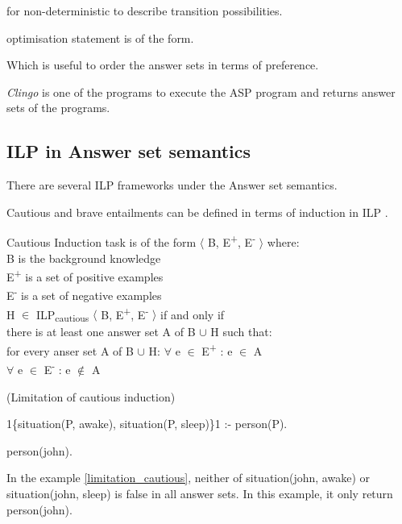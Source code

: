 \documentclass[12pt,twoside]{report}
\begin{document}
for non-deterministic to describe transition possibilities.

optimisation statement is of the form.

Which is useful to order the answer sets in terms of preference.

\textit{Clingo} is one of the programs to execute the ASP program and returns answer sets of the programs.


\subsection{ILP in Answer set semantics}

There are several ILP frameworks under the Answer set semantics.

Cautious and brave entailments can be defined in terms of induction in ILP \cite{Sakama2009}.


Cautious Induction task is of the form $\langle$ B, E\textsuperscript{+}, E\textsuperscript{-} $\rangle$ where: \\
B is the background knowledge \\
E\textsuperscript{+} is a set of positive examples \\
E\textsuperscript{-} is a set of negative examples \\

 H $\in$ ILP\textsubscript{cautious} $\langle$ B, E\textsuperscript{+}, E\textsuperscript{-} $\rangle$ if and only if  \\

 there is at least one answer set A of B $\cup$ H such that: \\
 for every anser set A of B $\cup$ H:
$\forall$ e $\in$ E\textsuperscript{+} : e $\in$ A \\
$\forall$ e $\in$ E\textsuperscript{-} : e $\notin$ A \\

\begin{examp} (Limitation of cautious induction)

1\{situation(P, awake), situation(P, sleep)\}1 :- person(P).

person(john).
\end{examp}
\label{limitation_cautious}

In the example \ref{limitation_cautious}, neither of situation(john, awake) or situation(john, sleep) is false in all answer sets. In this example, it only return person(john).
\end{document}
